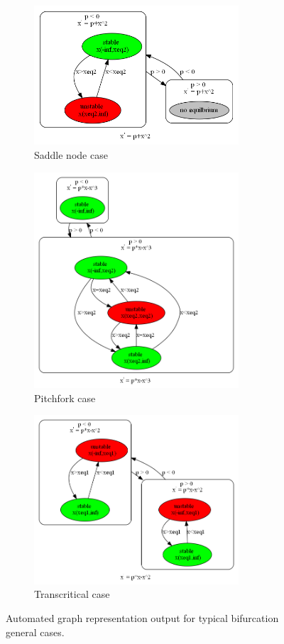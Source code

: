 \documentclass[12pt]{article}
\begin{document}
\begin{figure}[h]
\centering
\begin{subfigure}[b]{0.4\textwidth}
	\centering
	\includegraphics[width=3in]{feb24_graph_sn1.png}
	\caption{Saddle node case}
	\label{feb24_graph_sn1}
\end{subfigure}
\qquad \qquad
\begin{subfigure}[b]{0.4\textwidth}
	\centering
	\includegraphics[width=3in]{feb24_graph_pf1.png}
	\caption{Pitchfork case}
	\label{feb24_graph_pf1}
\end{subfigure}
\qquad \qquad
\begin{subfigure}[b]{0.4\textwidth}
	\centering
	\includegraphics[width=3in]{feb24_graph_tc1.png}
	\caption{Transcritical case}
	\label{feb24_graph_tc1}
\end{subfigure}
\caption{Automated graph representation output for typical bifurcation general cases.}
\label{feb24_graph}
\end{figure}
\end{document}

